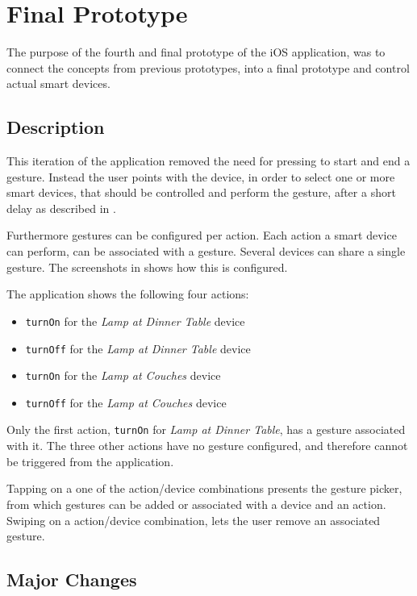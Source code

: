 \section{Final Prototype}
\label{sec:implementation:prototypes:prototype4}
The purpose of the fourth and final prototype of the iOS application, 
was to connect the concepts from previous prototypes, 
into a final prototype and control actual smart devices.

\subsection{Description}
This iteration of the application removed the need for pressing to start and end a gesture. 
Instead the user points with the device, 
in order to select one or more smart devices, 
that should be controlled and perform the gesture, 
after a short delay as described in .

Furthermore gestures can be configured per action. 
Each action a smart device can perform, 
can be associated with a gesture. 
Several devices can share a single gesture. 
The screenshots in  shows how this is configured.

The application shows the following four actions:
\begin{itemize}
\item \texttt{turnOn} for the \emph{Lamp at Dinner Table} device
\item \texttt{turnOff} for the \emph{Lamp at Dinner Table} device
\item \texttt{turnOn} for the \emph{Lamp at Couches} device
\item \texttt{turnOff} for the \emph{Lamp at Couches} device
\end{itemize}

Only the first action, 
\texttt{turnOn} for \emph{Lamp at Dinner Table}, 
has a gesture associated with it. 
The three other actions have no gesture configured, 
and therefore cannot be triggered from the application.

Tapping on a one of the action/device combinations presents the gesture picker, 
from which gestures can be added or associated with a device and an action. 
Swiping on a action/device combination, 
lets the user remove an associated gesture.

\subsection{Major Changes}

